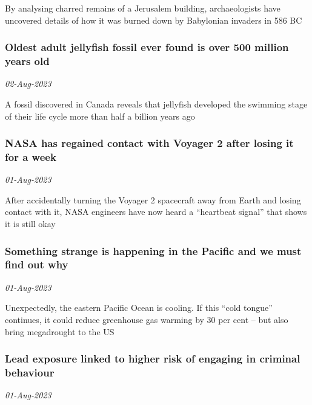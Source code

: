 By analysing charred remains of a Jerusalem building, archaeologists have uncovered details of how it was burned down by Babylonian invaders in 586 BC
\subsubsection{Oldest adult jellyfish fossil ever found is over 500 million years old \href{https://www.newscientist.com/article/2385670-oldest-adult-jellyfish-fossil-ever-found-is-over-500-million-years-old/?utm_campaign=RSS%7CNSNS&utm_source=NSNS&utm_medium=RSS&utm_content=home}{\ding{225}}}
\textit{02-Aug-2023}

A fossil discovered in Canada reveals that jellyfish developed the swimming stage of their life cycle more than half a billion years ago
\subsubsection{NASA has regained contact with Voyager 2 after losing it for a week \href{https://www.newscientist.com/article/2385738-nasa-has-regained-contact-with-voyager-2-after-losing-it-for-a-week/?utm_campaign=RSS%7CNSNS&utm_source=NSNS&utm_medium=RSS&utm_content=home}{}}
\textit{01-Aug-2023}

After accidentally turning the Voyager 2 spacecraft away from Earth and losing contact with it, NASA engineers have now heard a “heartbeat signal” that shows it is still okay
\subsubsection{Something strange is happening in the Pacific and we must find out why \href{https://www.newscientist.com/article/mg25934500-100-something-strange-is-happening-in-the-pacific-and-we-must-find-out-why/?utm_campaign=RSS%7CNSNS&utm_source=NSNS&utm_medium=RSS&utm_content=home}{\ding{225}}}
\textit{01-Aug-2023}

Unexpectedly, the eastern Pacific Ocean is cooling. If this “cold tongue” continues, it could reduce greenhouse gas warming by 30 per cent – but also bring megadrought to the US
\subsubsection{Lead exposure linked to higher risk of engaging in criminal behaviour \href{https://www.newscientist.com/article/2385578-lead-exposure-linked-to-higher-risk-of-engaging-in-criminal-behaviour/?utm_campaign=RSS%7CNSNS&utm_source=NSNS&utm_medium=RSS&utm_content=home}{}}
\textit{01-Aug-2023}

